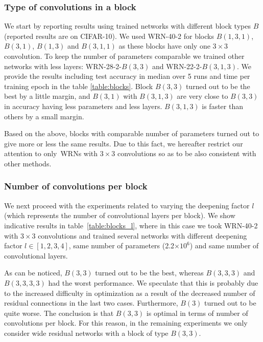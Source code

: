 \documentclass{bmvc2k}
\begin{document}
\subsubsection*{Type of convolutions in a block} We start by reporting results  using trained networks with different block types $B$ (reported results are on CIFAR-10). We used WRN-40-2 for blocks $B(1,3,1)$, $B(3,1)$, $B(1,3)$ and $B(3,1,1)$ as these blocks have only one $3\times3$ convolution. To keep the number of parameters comparable we trained other networks with less layers: WRN-28-2-$B(3,3)$ and WRN-22-2-$B(3,1,3)$. We provide the results including test accuracy in median over 5 runs and time per training epoch in the table \ref{table:blocks}. Block $B(3,3)$ turned out to be the best by a little margin, and $B(3,1)$ with $B(3,1,3)$ are very close to $B(3,3)$ in accuracy having less parameters and less layers. $B(3,1,3)$ is faster than others by a small margin.

Based on the above, blocks with comparable number of parameters turned out to give more or less the same results. Due to this fact, we hereafter restrict our attention to  only\ WRNs with $3\times3$ convolutions  so as to be also consistent with other methods.


\subsubsection*{Number of convolutions per block} We next proceed with the experiments related to varying the deepening factor $l$ (which represents the number of convolutional layers per block). We show indicative results in table~\ref{table:blocks_l}, where in this case we took WRN-40-2 with $3\times3$ convolutions and trained several networks with different deepening factor $l \in [1,2,3,4]$, same number of parameters (2.2$\times10^6$)  and same number of convolutional layers.

As can be noticed, $B(3,3)$ turned out to be the best, whereas $B(3,3,3)$ and $B(3,3,3,3)$ had the worst performance. We speculate that this is probably due to the increased difficulty in optimization as a result of the decreased number of residual connections in the last two cases. Furthermore, $B(3)$ turned out to be quite worse. The conclusion is that $B(3,3)$ is optimal in terms of number of convolutions per block. For this reason, in the remaining experiments we only consider wide residual networks with a block of type $B(3,3)$.
\end{document}
